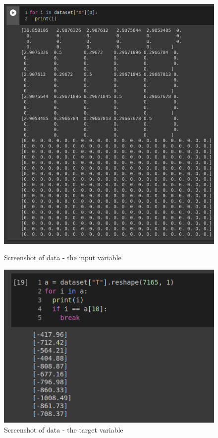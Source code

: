 \documentclass[a4paper,oneside,openright,11pt]{book}
\begin{document}
\begin{figure}[!htbp]
\centering
\includegraphics[scale=0.5]{DocumentFigures/MyFigures/input_data_CM.png}
\caption{Screenshot of data - the input variable}
\centering
\includegraphics[scale=0.8]{DocumentFigures/MyFigures/target_variable.png}
\caption{Screenshot of data - the target variable}
\end{figure}
\FloatBarrier
\end{document}

